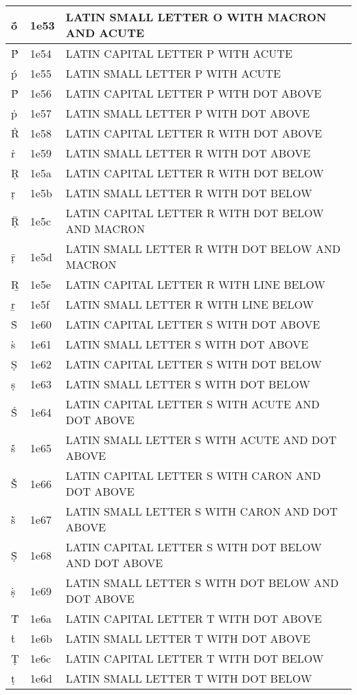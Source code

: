 \documentclass[12pt,letterpaper,openany]{book}
\begin{document}
\begin{center}
\begin{supertabular}{|m{0.25in}|m{0.5in}|m{4in}|}
ṓ & 1e53 & LATIN SMALL LETTER O WITH MACRON AND ACUTE\\\hline
Ṕ & 1e54 & LATIN CAPITAL LETTER P WITH ACUTE\\\hline
ṕ & 1e55 & LATIN SMALL LETTER P WITH ACUTE\\\hline
Ṗ & 1e56 & LATIN CAPITAL LETTER P WITH DOT ABOVE\\\hline
ṗ & 1e57 & LATIN SMALL LETTER P WITH DOT ABOVE\\\hline
Ṙ & 1e58 & LATIN CAPITAL LETTER R WITH DOT ABOVE\\\hline
ṙ & 1e59 & LATIN SMALL LETTER R WITH DOT ABOVE\\\hline
Ṛ & 1e5a & LATIN CAPITAL LETTER R WITH DOT BELOW\\\hline
ṛ & 1e5b & LATIN SMALL LETTER R WITH DOT BELOW\\\hline
Ṝ & 1e5c & LATIN CAPITAL LETTER R WITH DOT BELOW AND MACRON\\\hline
ṝ & 1e5d & LATIN SMALL LETTER R WITH DOT BELOW AND MACRON\\\hline
Ṟ & 1e5e & LATIN CAPITAL LETTER R WITH LINE BELOW\\\hline
ṟ & 1e5f & LATIN SMALL LETTER R WITH LINE BELOW\\\hline
Ṡ & 1e60 & LATIN CAPITAL LETTER S WITH DOT ABOVE\\\hline
ṡ & 1e61 & LATIN SMALL LETTER S WITH DOT ABOVE\\\hline
Ṣ & 1e62 & LATIN CAPITAL LETTER S WITH DOT BELOW\\\hline
ṣ & 1e63 & LATIN SMALL LETTER S WITH DOT BELOW\\\hline
Ṥ & 1e64 & LATIN CAPITAL LETTER S WITH ACUTE AND DOT ABOVE\\\hline
ṥ & 1e65 & LATIN SMALL LETTER S WITH ACUTE AND DOT ABOVE\\\hline
Ṧ & 1e66 & LATIN CAPITAL LETTER S WITH CARON AND DOT ABOVE\\\hline
ṧ & 1e67 & LATIN SMALL LETTER S WITH CARON AND DOT ABOVE\\\hline
Ṩ & 1e68 & LATIN CAPITAL LETTER S WITH DOT BELOW AND DOT ABOVE\\\hline
ṩ & 1e69 & LATIN SMALL LETTER S WITH DOT BELOW AND DOT ABOVE\\\hline
Ṫ & 1e6a & LATIN CAPITAL LETTER T WITH DOT ABOVE\\\hline
ṫ & 1e6b & LATIN SMALL LETTER T WITH DOT ABOVE\\\hline
Ṭ & 1e6c & LATIN CAPITAL LETTER T WITH DOT BELOW\\\hline
ṭ & 1e6d & LATIN SMALL LETTER T WITH DOT BELOW\\\hline

\end{supertabular}
\end{center}
\end{document}
